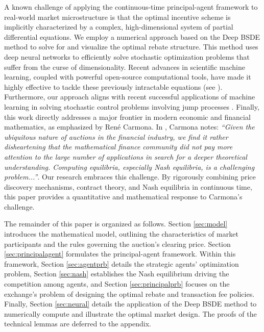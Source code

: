 \documentclass[12pt]{article}
\begin{document}
A known challenge of applying the continuous-time principal-agent framework to real-world market microstructure is that the optimal incentive scheme is implicitly characterized by a complex, high-dimensional system of partial differential equations. We employ a numerical approach based on the Deep BSDE method to solve for and visualize the optimal rebate structure. This method \cite{henry2017deep,han2020convergence,ji2020three,ji2022deep,dayanikli2025machine} uses deep neural networks to efficiently solve stochastic optimization problems that suffer from the curse of dimensionality. Recent advances in scientific machine learning, coupled with powerful open-source computational tools, have made it highly effective to tackle these previously intractable equations (see \cite{weinan2021algorithms,beck2020overview,raissi2024forward,han2017deep}). Furthermore, our approach aligns with recent successful applications of machine learning in solving stochastic control problems involving jump processes \cite{voskamp2023deep,lu2024multi,georgoulis2024deep}. Finally, this work directly addresses a major frontier in modern economic and financial mathematics, as emphasized by René Carmona. In \cite[Section 5.1]{carmona2022influence}, Carmona notes: \textit{``Given the ubiquitous nature of auctions in the financial industry, we find it rather disheartening that the mathematical finance community did not pay more attention to the large number of applications in search for a deeper theoretical understanding. Computing equilibria, especially Nash equilibria, is a challenging problem...''}. Our research embraces this challenge. By rigorously combining price discovery mechanisms, contract theory, and Nash equilibria in continuous time, this paper provides a quantitative and mathematical response to Carmona's challenge. 

\bigskip

The remainder of this paper is organized as follows. Section \ref{sec:model} introduces the mathematical model, outlining the characteristics of market participants and the rules governing the auction's clearing price. Section \ref{sec:principalagent} formulates the principal-agent framework. Within this framework, Section \ref{sec:agentprb} details the strategic agents' optimization problem, Section \ref{sec:nash} establishes the Nash equilibrium driving the competition among agents, and Section \ref{sec:principalprb} focuses on the exchange's problem of designing the optimal rebate and transaction fee policies. Finally, Section \ref{sec:neural} details the application of the Deep BSDE method to numerically compute and illustrate the optimal market design. The proofs of the technical lemmas are deferred to the appendix.
\end{document}
